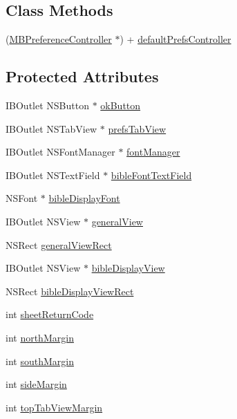 \subsection*{Class Methods}
\begin{DoxyCompactItemize}
\item 
(\hyperlink{interface_m_b_preference_controller}{M\-B\-Preference\-Controller} $\ast$) + \hyperlink{interface_m_b_preference_controller_abde398469d7204adb7ed0e3f49e8c4ad}{default\-Prefs\-Controller}
\end{DoxyCompactItemize}
\subsection*{Protected Attributes}
\begin{DoxyCompactItemize}
\item 
I\-B\-Outlet N\-S\-Button $\ast$ \hyperlink{interface_m_b_preference_controller_ae906d0d2be2867aebc1dcf8e7236653f}{ok\-Button}
\item 
I\-B\-Outlet N\-S\-Tab\-View $\ast$ \hyperlink{interface_m_b_preference_controller_a3d3fc3ece5953879cc1aabe9fcf06ce6}{prefs\-Tab\-View}
\item 
I\-B\-Outlet N\-S\-Font\-Manager $\ast$ \hyperlink{interface_m_b_preference_controller_abd6e307159416829da39ef1943265515}{font\-Manager}
\item 
I\-B\-Outlet N\-S\-Text\-Field $\ast$ \hyperlink{interface_m_b_preference_controller_a377b44af29a2a46db639dab3bb90905c}{bible\-Font\-Text\-Field}
\item 
N\-S\-Font $\ast$ \hyperlink{interface_m_b_preference_controller_a2773dde94ba430ad10a40b6933a792b6}{bible\-Display\-Font}
\item 
I\-B\-Outlet N\-S\-View $\ast$ \hyperlink{interface_m_b_preference_controller_a30b10ff27f47464ac2911aca154df50e}{general\-View}
\item 
N\-S\-Rect \hyperlink{interface_m_b_preference_controller_a36031b3bf0527296ba978278843898a2}{general\-View\-Rect}
\item 
I\-B\-Outlet N\-S\-View $\ast$ \hyperlink{interface_m_b_preference_controller_ad933f68e1fcaa0dac3bc6c7a5e28a136}{bible\-Display\-View}
\item 
N\-S\-Rect \hyperlink{interface_m_b_preference_controller_a5628e6feeb9cd57083260c90a2f2bb55}{bible\-Display\-View\-Rect}
\item 
int \hyperlink{interface_m_b_preference_controller_acc507979f5b4a4d2b23f6d1a7d6c3fb1}{sheet\-Return\-Code}
\item 
int \hyperlink{interface_m_b_preference_controller_ac21fb19707c332e8bc16a30962348c69}{north\-Margin}
\item 
int \hyperlink{interface_m_b_preference_controller_ae6614676d09f14abb00e53687264cf45}{south\-Margin}
\item 
int \hyperlink{interface_m_b_preference_controller_aef858cb6cad37704271ab6f404343cbe}{side\-Margin}
\item 
int \hyperlink{interface_m_b_preference_controller_acb5386c8297dee6f89eb11511f4d41f3}{top\-Tab\-View\-Margin}
\end{DoxyCompactItemize}
